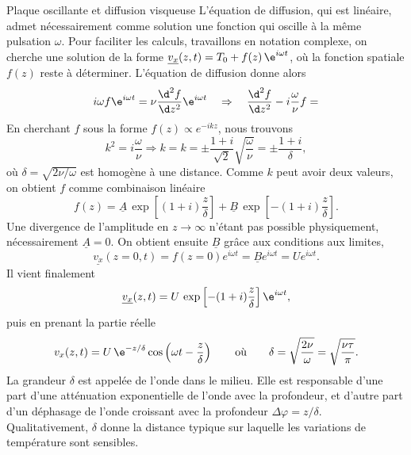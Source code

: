 \begin{exo}[PC][1]{Plaque oscillante et diffusion visqueuse}
{L'équation de diffusion, qui est linéaire, admet nécessairement comme solution une fonction qui oscille à la même pulsation $\omega$.
Pour faciliter les calculs, travaillons en notation complexe,
on cherche une solution de la forme $\underline{v_x}(z,t)=T_{0}+f(z)\,\e^{i\omega t}$, où la fonction spatiale $f(z)$ reste à déterminer.
L'équation de diffusion donne alors
\begin{equation}
i\omega f\e^{i\omega t}=\nu\frac{\d^2 f}{\d z^2}\e^{i\omega t}\quad\Rightarrow\quad \frac{\d^2 f}{\d z^2}-i\frac{\omega}{\nu}f = 
\end{equation}
En cherchant $f$ sous la forme $f(z) \propto e^{-ikz}$, nous trouvons
\begin{equation}
k^2=i\frac{\omega}{\nu} \Rightarrow k = k=\pm\frac{1+i}{\sqrt{2}}\sqrt{\frac{\omega}{\nu}} = \pm\frac{1+i}{\delta},
\end{equation}
où $\delta = \sqrt{2\nu/\omega}$ est homogène à une distance. Comme $k$ peut avoir deux valeurs, on obtient $f$ comme combinaison linéaire
\begin{equation}
f(z)=\underline{A}\,\exp\left[(1+i)\frac{z}{\delta}\right]+\underline{B}\,\exp\left[-(1+i)\frac{z}{\delta}\right].
\end{equation}
Une divergence de l'amplitude en $z\rightarrow\infty$ n'étant pas possible physiquement, nécessairement $\underline{A}=0$. On obtient ensuite $\underline{B}$ grâce aux conditions aux limites,
\begin{equation}
\underline{v_x}(z=0,t)=f(z=0)e^{i\omega t}=\underline{B}e^{i\omega t} = U e^{i\omega t}.
\end{equation}
Il vient finalement
\begin{equation}
\begin{split}
\underline{v_x}(z,t)=U\,\exp\left[-(1+i)\frac{z}{\delta}\right]\e^{i\omega t},
\end{split}
\end{equation}
puis en prenant la partie réelle
\begin{equation}
v_x(z,t) = U\,\e^{-z/\delta}\cos\left(\omega t-\dfrac{z}{\delta}\right)\qquad\text{où}\qquad\delta=\sqrt{\frac{2\nu}{\omega}}=\sqrt{\frac{\nu \tau}{\pi}}.
\end{equation}
La grandeur $\delta$ est appelée  de l'onde dans le milieu.
Elle est responsable d'une part d'une atténuation exponentielle de l'onde avec la profondeur, et d'autre part d'un déphasage de l'onde croissant avec la profondeur $\Delta\varphi = z/\delta$. Qualitativement, $\delta$ donne la distance typique sur laquelle les variations de température sont sensibles.
}
\end{exo}
